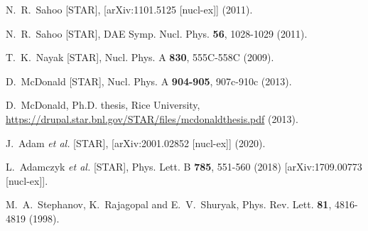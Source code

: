 \begin{thebibliography}{99}
N.~R.~Sahoo [STAR],
[arXiv:1101.5125 [nucl-ex]] (2011).

N.~R.~Sahoo [STAR],
DAE Symp. Nucl. Phys. \textbf{56}, 1028-1029 (2011).

T.~K.~Nayak [STAR],
Nucl. Phys. A \textbf{830}, 555C-558C (2009).

D.~McDonald [STAR],
Nucl. Phys. A \textbf{904-905}, 907c-910c (2013).

D.~McDonald,
Ph.D. thesis, Rice University, \href{https://drupal.star.bnl.gov/STAR/files/mcdonaldthesis.pdf}{https://drupal.star.bnl.gov/STAR/files/mcdonaldthesis.pdf} (2013).

J.~Adam \textit{et al.} [STAR],
[arXiv:2001.02852 [nucl-ex]] (2020).

L.~Adamczyk \textit{et al.} [STAR],
Phys. Lett. B \textbf{785}, 551-560 (2018)
[arXiv:1709.00773 [nucl-ex]].

M.~A.~Stephanov, K.~Rajagopal and E.~V.~Shuryak,
Phys. Rev. Lett. \textbf{81}, 4816-4819 (1998).


\end{thebibliography}

